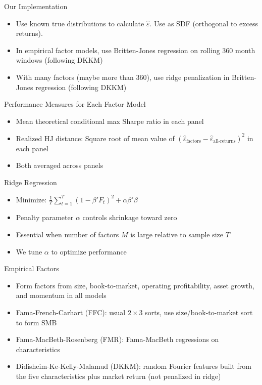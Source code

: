 \documentclass[aspectratio=169]{beamer}
\begin{document}
\begin{frame}{Our Implementation}
\begin{itemize}
\item Use known true distributions to calculate $\hat \varepsilon$.  Use as SDF (orthogonal to excess returns).
\item In empirical factor models, use Britten-Jones regression on rolling 360 month windows (following DKKM)
\item With many factors (maybe more than 360), use ridge penalization in Britten-Jones regression (following DKKM)
\end{itemize}
\end{frame}

\begin{frame}{Performance Measures for Each Factor Model}
\begin{itemize}
\item Mean theoretical conditional max Sharpe ratio in each panel
\item Realized HJ distance: Square root of mean value of $(\hat \varepsilon_{\text{factors}} - \hat \varepsilon_{\text{all-returns}})^2$ in each panel
\item Both averaged across panels
\end{itemize}
\end{frame}

\begin{frame}{Ridge Regression}
\begin{itemize}
  \item Minimize: $\frac{1}{T}\sum_{t=1}^T (1 - \beta' F_t)^2 + \alpha \beta'\beta$
  \item Penalty parameter $\alpha$ controls shrinkage toward zero
  \item Essential when number of factors $M$ is large relative to sample size $T$
  \item We tune $\alpha$ to optimize performance
\end{itemize}
\end{frame}

\begin{frame}{Empirical Factors}
\begin{itemize}
\item Form factors from size, book-to-market, operating profitability, asset growth, and momentum in all models
\item Fama-French-Carhart (FFC): usual $2\times 3$ sorts, use size/book-to-market sort to form SMB
\item Fama-MacBeth-Rosenberg (FMR): Fama-MacBeth regressions on characteristics
\item Didisheim-Ke-Kelly-Malamud (DKKM): random Fourier features built from the five characteristics plus market return (not penalized in ridge)
\end{itemize}
\end{frame}
\end{document}
